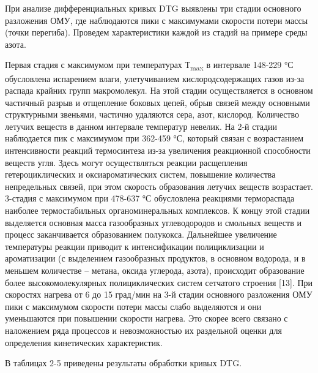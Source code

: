 \begin{multicols}{2}
При анализе дифференциальных кривых DTG выявлены три стадии основного
разложения ОМУ, где наблюдаются пики с максимумами скорости потери массы
(точки перегиба). Проведем характеристики каждой из стадий на примере
среды азота.

Первая стадия с максимумом при температурах Т\textsubscript{max} в
интервале 148-229 °С обусловлена испарением влаги, улетучиванием
кислородсодержащих газов из-за распада крайних групп макромолекул. На
этой стадии осуществляется в основном частичный разрыв и отщепление
боковых цепей, обрыв связей между основными структурными звеньями,
частично удаляются сера, азот, кислород. Количество летучих веществ в
данном интервале температур невелик. На 2-й стадии наблюдается пик с
максимумом при 362-459 °С, который связан с возрастанием интенсивности
реакций термосинтеза из-за увеличения реакционной способности веществ
угля. Здесь могут осуществляться реакции расщепления гетероциклических и
оксиароматических систем, повышение количества непредельных связей, при
этом скорость образования летучих веществ возрастает.\\
3-стадия с максимумом при 478-637 °С обусловлена реакциями термораспада
наиболее термостабильных органоминеральных комплексов. К концу этой
стадии выделяется основная масса газообразных углеводородов и смольных
веществ и процесс заканчивается образованием полукокса. Дальнейшее
увеличение температуры реакции приводит к интенсификации полициклизации
и ароматизации (с выделением газообразных продуктов, в основном
водорода, и в меньшем количестве -- метана, оксида углерода, азота),
происходит образование более высокомолекулярных полициклических систем
сетчатого строения {[}13{]}. При скоростях нагрева от 6 до 15 град/мин
на 3-й стадии основного разложения ОМУ пики с максимумом скорости потери
массы слабо выделяются и они уменьшаются при повышении скорости нагрева.
Это скорее всего связано с наложением ряда процессов и невозможностью их
раздельной оценки для определения кинетических характеристик.

В таблицах 2-5 приведены результаты обработки кривых DTG.
\end{multicols}


